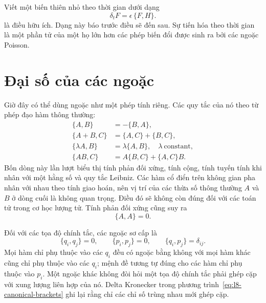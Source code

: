 \begin{classroomqa}
\end{classroomqa}

Viết một biến thiên nhỏ theo thời gian dưới dạng
\begin{equation}
  \delta_t F=\epsilon\,\{F,H\}.
  \label{eq:l8-small-time-step}
\end{equation}
là điều hữu ích. Dạng này báo trước điều sẽ đến sau. Sự tiến hóa theo thời gian là một phần tử của một họ lớn hơn các phép biến đổi được sinh ra bởi các ngoặc Poisson.

\section{Đại số của các ngoặc}

Giờ đây có thể dùng ngoặc như một phép tính riêng. Các quy tắc của nó theo từ phép đạo hàm thông thường:
\begin{align}
  \{A,B\}&=-\{B,A\}, \label{eq:l8-antisymmetry}\\
  \{A+B,C\}&=\{A,C\}+\{B,C\}, \label{eq:l8-additivity}\\
  \{\lambda A,B\}&=\lambda\{A,B\},
    \quad \lambda\ \text{constant}, \label{eq:l8-scalar-rule}\\
  \{AB,C\}&=A\{B,C\}+\{A,C\}B. \label{eq:l8-leibniz}
\end{align}
Bốn dòng này lần lượt biểu thị tính phản đối xứng, tính cộng, tính tuyến tính khi nhân với một hằng số và quy tắc Leibniz.
Các hàm cổ điển trên không gian pha nhân với nhau theo tính giao hoán, nên vị trí của các thừa số thông thường \(A\) và \(B\) ở dòng cuối là không quan trọng. Điều đó sẽ không còn đúng đối với các toán tử trong cơ học lượng tử. Tính phản đối xứng cũng suy ra
\begin{equation}
  \{A,A\}=0.
  \label{eq:l8-self-bracket}
\end{equation}

Đối với các tọa độ chính tắc, các ngoặc sơ cấp là
\begin{equation}
  \boxed{
  \{q_i,q_j\}=0,\qquad
  \{p_i,p_j\}=0,\qquad
  \{q_i,p_j\}=\delta_{ij}.}
  \label{eq:l8-canonical-brackets}
\end{equation}
Mọi hàm chỉ phụ thuộc vào các \(q_i\) đều có ngoặc bằng không với mọi hàm khác cũng chỉ phụ thuộc vào các \(q_i\); mệnh đề tương tự đúng cho các hàm chỉ phụ thuộc vào
\(p_i\). Một ngoặc khác không đòi hỏi một tọa độ chính tắc phải ghép cặp với xung lượng liên hợp của nó. Delta Kronecker trong phương trình~\eqref{eq:l8-canonical-brackets} ghi lại rằng chỉ các chỉ số trùng nhau mới ghép cặp.

